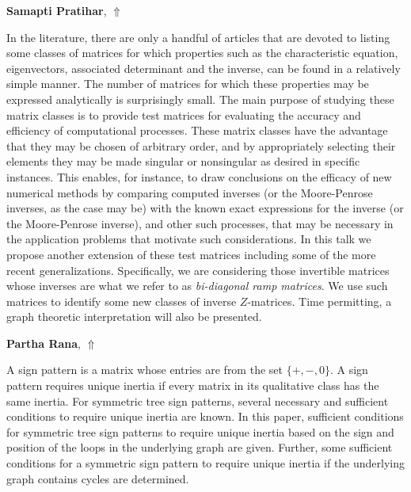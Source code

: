 \documentclass[ILAS2025-program.tex]{subfiles}
\begin{document}
\hypertarget{down0404}{}\begin{ilasabstract}
    
\textbf{Samapti Pratihar},  \hfill \hyperlink{up0404}{$\Uparrow$}
    
    
\mtskip
    In the literature, there are only a handful of articles that are devoted to listing some classes of matrices for which properties such as the characteristic equation, eigenvectors, associated determinant and the inverse, can be found in a relatively simple manner. The number of matrices for which these properties may be expressed analytically is surprisingly small. The main purpose of studying these matrix classes is to provide test matrices for evaluating the accuracy and efficiency of computational processes. These matrix classes have the advantage that they may be chosen of arbitrary order, and by appropriately selecting their elements they may be made singular or nonsingular as desired in specific instances. This enables, for instance, to draw conclusions on the efficacy of new numerical methods by comparing computed inverses (or the Moore-Penrose inverses, as the case may be) with the known exact expressions for the inverse (or the Moore-Penrose inverse), and other such processes, that may be necessary in the application problems that motivate such considerations. In this talk we propose another extension of these test matrices including some of the more recent generalizations. Specifically, we are considering those invertible matrices whose inverses are what we refer to as {\it bi-diagonal ramp matrices}. We use such matrices to identify some new classes of inverse $Z$-matrices. Time permitting, a graph theoretic interpretation will also be presented.

\end{ilasabstract}
    

\hypertarget{down0396}{}\begin{ilasabstract}
    
\textbf{Partha Rana},  \hfill \hyperlink{up0396}{$\Uparrow$}
    
    
\mtskip
    A sign pattern is a matrix whose entries are from the set $\{+,-,0\}$. A sign pattern requires unique inertia if every matrix in its qualitative class has the same inertia. For symmetric tree sign patterns, several necessary and sufficient conditions to require unique inertia are known. In this paper, sufficient conditions for symmetric tree sign patterns to require unique inertia based on the sign and position of the loops in the underlying graph are given. Further, some sufficient conditions for a symmetric sign pattern to require unique inertia if the underlying graph contains cycles are determined.
\end{ilasabstract}
    
\end{document}
